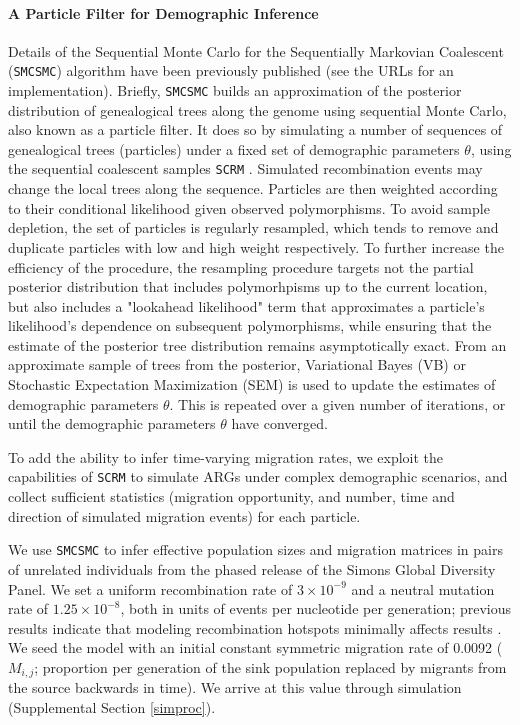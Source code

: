 \documentclass{article}
\begin{document}
\paragraph{A Particle Filter for Demographic Inference} Details of the Sequential Monte Carlo for the Sequentially Markovian Coalescent ({\tt SMCSMC}) algorithm have been previously published \cite{Henderson2018} (see the URLs for an implementation). Briefly, {\tt SMCSMC} builds an approximation of the posterior distribution of genealogical trees along the genome using sequential Monte Carlo, also known as a particle filter. It does so by simulating a number of sequences of genealogical trees (particles) under a fixed set of demographic parameters $\theta$, using the sequential coalescent samples {\tt SCRM} \cite{staab2015}. Simulated recombination events may change the local trees along the sequence. Particles are then weighted according to their conditional likelihood given observed polymorphisms.  To avoid sample depletion, the set of particles is regularly resampled, which tends to remove and duplicate particles with low and high weight respectively.  To further increase the efficiency of the procedure, the
resampling procedure targets not the partial posterior distribution that includes polymorhpisms up to the current location,
but also includes a "lookahead likelihood" term that approximates a particle's likelihood's dependence on subsequent polymorphisms,
while ensuring that the estimate of the posterior tree distribution remains asymptotically exact.  From an approximate sample
of trees from the posterior, Variational Bayes (VB) or Stochastic Expectation Maximization (SEM) is used to update the estimates of demographic parameters $\theta$. This is repeated over a given number of iterations, or until the demographic parameters $\theta$ have converged.

To add the ability to infer time-varying migration rates, we exploit the capabilities of {\tt SCRM} to simulate ARGs under complex demographic scenarios, and collect sufficient statistics (migration opportunity, and number, time and direction of simulated migration events) for each particle.

We use {\tt SMCSMC} to infer effective population sizes and migration matrices in pairs of unrelated individuals from the phased release of the Simons Global Diversity Panel. We set a uniform recombination rate of $3\times10^{-9}$ and a neutral mutation rate of $1.25\times10^{-8}$, both in units of events per nucleotide per generation; previous results indicate that modeling recombination
hotspots minimally affects results \cite{Li2011}. 
We seed the model with an initial constant symmetric  migration rate of 0.0092 ($M_{i,j}$; proportion per generation of the sink population replaced by migrants from the source backwards in time). We arrive at this value through simulation (Supplemental Section \ref{simproc}).
\end{document}
